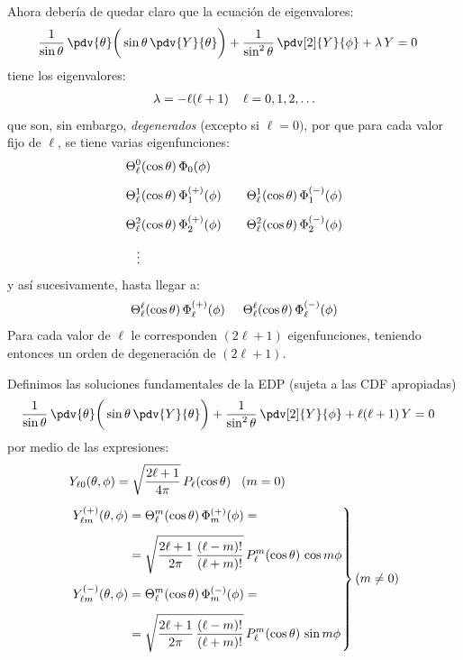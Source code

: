 Ahora debería de quedar claro que la ecuación de eigenvalores:
\begin{align*}
\dfrac{1}{\sin \theta} \, \pdv{\theta} \bigg( \sin \theta \, \pdv{Y}{\theta} \bigg) &+ \dfrac{1}{\sin^{2} \theta} \, \pdv[2]{Y}{\phi} + \lambda \, Y = 0
\end{align*}
tiene los eigenvalores:
\begin{align*}
\lambda = - \ell (\ell + 1) \hspace{0.4cm} \ell = 0, 1, 2, \ldots
\end{align*}
que son, sin embargo, \emph{degenerados} (excepto si $\ell = 0)$, por que para cada valor fijo de $\ell$, se tiene varias eigenfunciones:
\begin{align*}
&\Theta_{\ell}^{0} (\cos \theta) \, \Phi_{0} (\phi) \\[0.5em]
&\Theta_{\ell}^{1} (\cos \theta) \, \Phi_{1}^{(+)} (\phi) \hspace{0.7cm} \Theta_{\ell}^{1} (\cos \theta) \, \Phi_{1}^{(-)} (\phi) \\[0.5em]
&\Theta_{\ell}^{2} (\cos \theta) \, \Phi_{2}^{(+)} (\phi) \hspace{0.7cm} \Theta_{\ell}^{2} (\cos \theta) \, \Phi_{2}^{(-)} (\phi) \\[0.5em]
&{} \hspace{0.3cm} \vdots
\end{align*}
y así sucesivamente, hasta llegar a:
\begin{align*}
\Theta_{\ell}^{\ell} (\cos \theta) \, \Phi_{\ell}^{(+)} (\phi) \hspace{0.5cm} \Theta_{\ell}^{\ell} (\cos \theta) \, \Phi_{\ell}^{(-)} (\phi)
\end{align*}
Para cada valor de $\ell$ le corresponden $(2 \ell + 1)$ eigenfunciones, teniendo entonces un orden de degeneración de $(2 \ell + 1)$.
\par
Definimos las soluciones fundamentales de la EDP (sujeta a las CDF apropiadas)
\begin{align*}
\dfrac{1}{\sin \theta} \, \pdv{\theta} \bigg( \sin \theta \, \pdv{Y}{\theta} \bigg) &+ \dfrac{1}{\sin^{2} \theta} \, \pdv[2]{Y}{\phi} + \ell (\ell + 1) \, Y = 0
\end{align*}
por medio de las expresiones:
\begin{align*}
&Y_{\ell 0} (\theta, \phi) = \sqrt{\dfrac{2 \ell + 1}{4 \pi}} \, P_{\ell} (\cos \theta) \hspace{0.3cm} (m = 0) \\[0.5em]
&\left. \begin{aligned}
Y_{\ell m}^{(+)} (\theta, \phi) &= \Theta_{\ell}^{m} (\cos \theta) \, \Phi_{m}^{(+)} (\phi) = \\[0.5em]
&= \sqrt{\dfrac{2 \ell + 1}{2 \pi} \, \dfrac{(\ell - m)!}{(\ell + m)!}} \, P_{\ell}^{m} (\cos \theta) \, \cos m \phi \\[0.5em]
Y_{\ell m}^{(-)} (\theta, \phi) &= \Theta_{\ell}^{m} (\cos \theta) \, \Phi_{m}^{(-)} (\phi) = \\[0.5em]
&= \sqrt{\dfrac{2 \ell + 1}{2 \pi} \, \dfrac{(\ell - m)!}{(\ell + m)!}} \, P_{\ell}^{m} (\cos \theta) \, \sin m \phi
\end{aligned} \right\}
(m \neq 0)
\end{align*}
